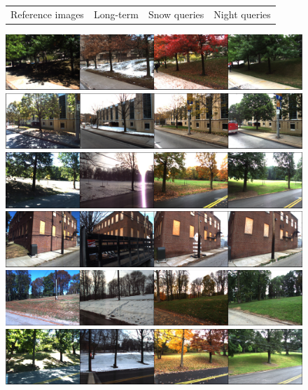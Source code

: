 \begin{figure}[t]
\begin{minipage}[t]{0.44\linewidth}
		\scriptsize
		\begin{tabularx}
		{\linewidth}{X X X X}
			Reference images & 	Long-term & Snow queries & Night queries
		\end{tabularx}
	\end{minipage}\hfill	
	\begin{minipage}[t]{0.55\linewidth}
		\includegraphics[width=\linewidth]{details/cmu_exs/ex1}
		
		\includegraphics[width=\linewidth]{details/cmu_exs/ex6}
		
		\includegraphics[width=\linewidth]{details/cmu_exs/ex4}	
		
		\includegraphics[width=\linewidth]{details/cmu_exs/ex2}	
		
		\includegraphics[width=\linewidth]{details/cmu_exs/ex3}	
		
		\includegraphics[width=\linewidth]{details/cmu_exs/ex5}	
		

\end{minipage}
\end{figure}
